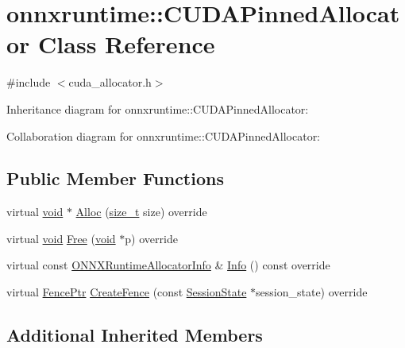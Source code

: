 \hypertarget{classonnxruntime_1_1CUDAPinnedAllocator}{}\section{onnxruntime\+:\+:C\+U\+D\+A\+Pinned\+Allocator Class Reference}
\label{classonnxruntime_1_1CUDAPinnedAllocator}


{\ttfamily \#include $<$cuda\+\_\+allocator.\+h$>$}



Inheritance diagram for onnxruntime\+:\+:C\+U\+D\+A\+Pinned\+Allocator\+:


Collaboration diagram for onnxruntime\+:\+:C\+U\+D\+A\+Pinned\+Allocator\+:
\subsection*{Public Member Functions}
\begin{DoxyCompactItemize}
\item 
virtual \mbox{\hyperlink{mlasi_8h_a88f941d423cb2a819b70a1358982b1a6}{void}} $\ast$ \mbox{\hyperlink{classonnxruntime_1_1CUDAPinnedAllocator_a22d04b010dc7782d37689ae50bab2535}{Alloc}} (\mbox{\hyperlink{mlasi_8h_a503efbc1c6e50825320ad909366b78ab}{size\+\_\+t}} size) override
\item 
virtual \mbox{\hyperlink{mlasi_8h_a88f941d423cb2a819b70a1358982b1a6}{void}} \mbox{\hyperlink{classonnxruntime_1_1CUDAPinnedAllocator_a2d28c8305e862060b9e5337073cda109}{Free}} (\mbox{\hyperlink{mlasi_8h_a88f941d423cb2a819b70a1358982b1a6}{void}} $\ast$p) override
\item 
virtual const \mbox{\hyperlink{structONNXRuntimeAllocatorInfo}{O\+N\+N\+X\+Runtime\+Allocator\+Info}} \& \mbox{\hyperlink{classonnxruntime_1_1CUDAPinnedAllocator_af08d82e6f7b890059386326ac371950a}{Info}} () const override
\item 
virtual \mbox{\hyperlink{namespaceonnxruntime_a42d52aa37e4dba8c02178f81eda99eeb}{Fence\+Ptr}} \mbox{\hyperlink{classonnxruntime_1_1CUDAPinnedAllocator_ac484f5708f516cc19cc788404e173367}{Create\+Fence}} (const \mbox{\hyperlink{classonnxruntime_1_1SessionState}{Session\+State}} $\ast$session\+\_\+state) override
\end{DoxyCompactItemize}
\subsection*{Additional Inherited Members}


